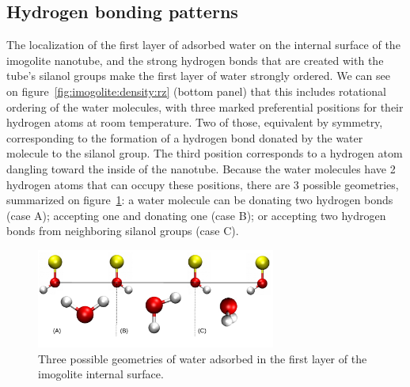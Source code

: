 \documentclass[thesis]{subfiles}
\begin{document}
\FloatBarrier
\subsection{Hydrogen bonding patterns}

The localization of the first layer of adsorbed water on the internal surface of
the imogolite nanotube, and the strong hydrogen bonds that are created with the
tube's silanol groups make the first layer of water strongly ordered. We can see
on figure~\ref{fig:imogolite:density:rz} (bottom panel) that this includes
rotational ordering of the water molecules, with three marked preferential
positions for their hydrogen atoms at room temperature. Two of those, equivalent
by symmetry, corresponding to the formation of a hydrogen bond donated by the
water molecule to the silanol group. The third position corresponds to a
hydrogen atom dangling toward the inside of the nanotube. Because the water
molecules have 2 hydrogen atoms that can occupy these positions, there are 3
possible geometries, summarized on figure~\ref{fig:imogolite:hbonds:surface}: a
water molecule can be donating two hydrogen bonds (case A); accepting one and
donating one (case B); or accepting two hydrogen bonds from neighboring silanol
groups (case C).

\begin{figure}[ht]
    \centering
    \includegraphics[width=0.7\textwidth]{figures/images/imogolite-hbonds-surface}
	\caption{Three possible geometries of water adsorbed in the first layer of
    the imogolite internal surface.}
    \label{fig:imogolite:hbonds:surface}
\end{figure}

\end{document}

